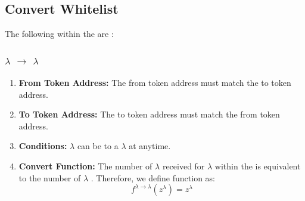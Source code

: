 \documentclass[class=article, crop=false]{standalone}
\begin{document}
\subsection{Convert Whitelist} 

The following  within the  are :
\subsubsection{$\lambda$ $\rightarrow$ $\lambda$}
    \begin{enumerate}
        \item \textbf{From Token Address:} The from token address must match the to token address.
        \item \textbf{To Token Address:} The to token address must match the from token address.
        \item \textbf{Conditions:}  $\lambda$ can be  to a $\lambda$  at anytime. 
        \item \textbf{Convert Function:} The number of $\lambda$ received for   $\lambda$ within the  is equivalent to the number of $\lambda$ . Therefore, we define  function as:
$$f^{\lambda \rightarrow \lambda}(z^{\lambda}) = z^{\lambda}$$

    \end{enumerate}
\end{document}
